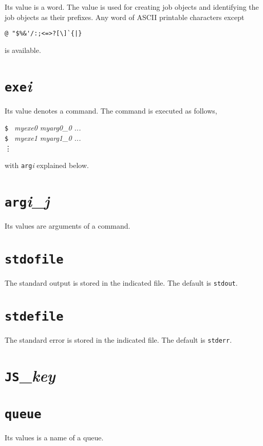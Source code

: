 \documentclass[a4paper,10pt]{report}
\begin{document}
Its value is a word.  The value is used for creating job objects and
identifying the job objects as their prefixes.  Any word of ASCII
printable characters except
\begin{center}
\verb*+@ "$%&'/:;<=>?[\]`{|}+        %
\end{center}
is available.

\section{\texttt{exe}\textit{i}}

Its value denotes a command.  The command is executed as follows,
\begin{screen}
\texttt{\$ } \textit{myexe0 myarg0\_0 ...}\\
\texttt{\$ } \textit{myexe1 myarg1\_0 ...}\\
\vdots
\end{screen}
with \texttt{arg}\textit{i} explained below.

\section{\texttt{arg}\textit{i}\_\textit{j}}

Its values are arguments of a command.

\section{\texttt{stdofile}}

The standard output is stored in the indicated file.
The default is \texttt{stdout}.

\section{\texttt{stdefile}}

The standard error is stored in the indicated file.
The default is \texttt{stderr}.

\section{\texttt{JS}\_\textit{key}}

\section{\texttt{queue}}

Its values is a name of a queue.
\end{document}
